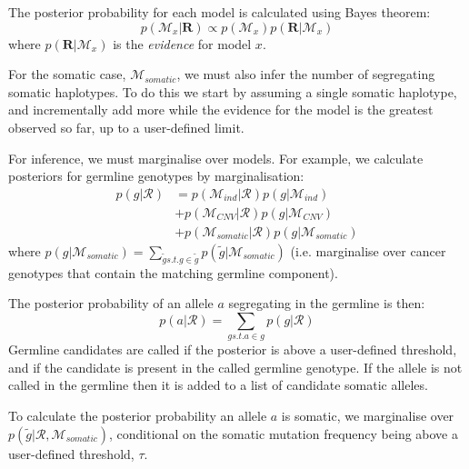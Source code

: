 \documentclass[notitlepage, twocolumn, 10pt]{article}
\begin{document}
The posterior probability for each model is calculated using Bayes theorem:
\begin{equation*}
    p(\mathcal{M}_{x} | \boldsymbol{R}) \propto p(\mathcal{M}_{x}) p(\boldsymbol{R} | \mathcal{M}_{x})  
\end{equation*}
where $p(\boldsymbol{R} | \mathcal{M}_{x})$ is the \emph{evidence} for model $x$.

For the somatic case, $\mathcal{M}_{somatic}$, we must also infer the number of segregating somatic haplotypes. To do this we start by assuming a single somatic haplotype, and incrementally add more while the evidence for the model is the greatest observed so far, up to a user-defined limit.

For inference, we must marginalise over models. For example, we calculate posteriors for germline genotypes by marginalisation:
\begin{align*}
p(g | \boldsymbol{\mathcal{R}}) &= p(\mathcal{M}_{ind} | \boldsymbol{\mathcal{R}}) p(g | \mathcal{M}_{ind}) \\
&+ p(\mathcal{M}_{CNV} | \boldsymbol{\mathcal{R}}) p(g | \mathcal{M}_{CNV}) \\
&+ p(\mathcal{M}_{somatic} | \boldsymbol{\mathcal{R}}) p(g | \mathcal{M}_{somatic})
\end{align*}
where $p(g | \mathcal{M}_{somatic}) = \sum_{\tilde{g} s.t. g \in \tilde{g}} p(\tilde{g} | \mathcal{M}_{somatic})$ (i.e. marginalise over cancer genotypes that contain the matching germline component).

The posterior probability of an allele $a$ segregating in the germline is then:
\begin{equation*}
p(a | \boldsymbol{\mathcal{R}}) = \sum_{g s.t. a \in g} p(g | \boldsymbol{\mathcal{R}})
\end{equation*}
Germline candidates are called if the posterior is above a user-defined threshold, and if the candidate is present in the called germline genotype. If the allele is not called in the germline then it is added to a list of candidate somatic alleles.

To calculate the posterior probability an allele $a$ is somatic, we marginalise over $p(\tilde{g} | \boldsymbol{\mathcal{R}}, \mathcal{M}_{somatic})$, conditional on the somatic mutation frequency being above a user-defined threshold, $\tau$.
\end{document}
